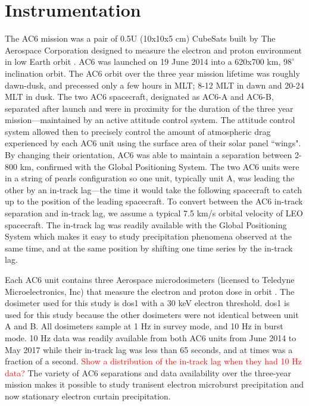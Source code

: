 \documentclass[draft]{agujournal2019}
\begin{document}
\section{Instrumentation} \label{instrumentation}
The AC6 mission was a pair of 0.5U (10x10x5 cm) CubeSats built by The Aerospace Corporation designed to measure the electron and proton environment in low Earth orbit \cite{O'brien2016}. AC6 was launched on 19 June 2014 into a 620x700 km, $98^\circ$ inclination orbit. The AC6 orbit over the three year mission lifetime was roughly dawn-dusk, and precessed only a few hours in MLT; 8-12 MLT in dawn and 20-24 MLT in dusk. The two AC6 spacecraft, designated as AC6-A and AC6-B, separated after launch and were in proximity for the duration of the three year mission---maintained by an active attitude control system. The attitude control system allowed then to precisely control the amount of atmospheric drag experienced by each AC6 unit using the surface area of their solar panel ``wings". By changing their orientation, AC6 was able to maintain a separation between 2-800 km, confirmed with the Global Positioning System. The two AC6 units were in a string of pearls configuration so one unit, typically unit A, was leading the other by an in-track lag---the time it would take the following spacecraft to catch up to the position of the leading spacecraft. To convert between the AC6 in-track separation and in-track lag, we assume a typical 7.5 km/s orbital velocity of LEO spacecraft. The in-track lag was readily available with the Global Positioning System which makes it easy to study precipitation phenomena observed at the same time, and at the same position by shifting one time series by the in-track lag.

Each AC6 unit contains three Aerospace microdosimeters (licensed to Teledyne Microelectronics, Inc) that measure the electron and proton dose in orbit \cite{O'brien2016}. The dosimeter used for this study is dos1 with a $30$ keV electron threshold. dos1 is used for this study because the other dosimeters were not identical between unit A and B. All dosimeters sample at 1 Hz in survey mode, and 10 Hz in burst mode. 10 Hz data was readily available from both AC6 units from June 2014 to May 2017 while their in-track lag was less than 65 seconds, and at times was a fraction of a second. \textcolor{red}{Show a distribution of the in-track lag when they had 10 Hz data?} The variety of AC6 separations and data availability over the three-year mission makes it possible to study tranisent electron microburst precipitation \cite{Shumko2020} and now stationary electron curtain precipitation.
\end{document}
